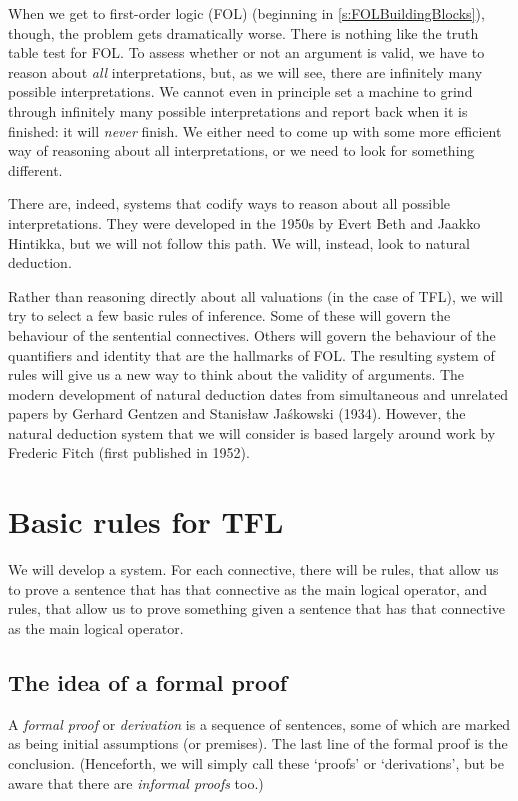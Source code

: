 When we get to first-order logic (FOL) (beginning in \cref{s:FOLBuildingBlocks}), though, the problem gets dramatically worse. There is nothing like the truth table test for FOL. To assess whether or not an argument is valid, we have to reason about \emph{all} interpretations, but, as we will see, there are infinitely many possible interpretations. We cannot even in principle set a machine to grind through infinitely many possible interpretations and report back when it is finished: it will \emph{never} finish. We either need to come up with some more efficient way of reasoning about all interpretations, or we need to look for something different.

There are, indeed, systems that codify ways to reason about all possible interpretations. They were developed in the 1950s by Evert Beth and Jaakko Hintikka, but we will not follow this path. We will, instead, look to natural deduction.

Rather than reasoning directly about all valuations (in the case of TFL), we will try to select a few basic rules of inference. Some of these will govern the behaviour of the sentential connectives. Others will govern the behaviour of the quantifiers and identity that are the hallmarks of FOL. The resulting system of rules will give us a new way to think about the validity of arguments.
The modern development of natural deduction dates from simultaneous and unrelated papers by Gerhard Gentzen and Stanis\l{}aw Ja\'{s}kowski (1934). However, the natural deduction system that we will consider is based largely around work by Frederic Fitch (first published in 1952).


\chapter{Basic rules for TFL}\label{s:BasicTFL}
We will develop a  system. For each connective, there will be  rules, that allow us to prove a sentence that has that connective as the main logical operator, and  rules, that allow us to prove something given a sentence that has that connective as the main logical operator.

\section{The idea of a formal proof}
A \emph{formal proof} or \emph{derivation} is a sequence of sentences,
some of which are marked as being initial assumptions (or premises).
The last line of the formal proof is the conclusion. (Henceforth, we
will simply call these `proofs' or `derivations', but be aware that
there are \emph{informal proofs} too.)

